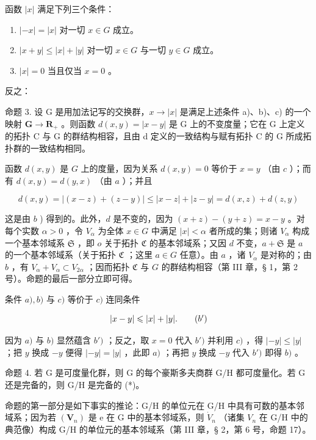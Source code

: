 函数 \(|x|\) 满足下列三个条件：

\begin{enumerate}
\def\labelenumi{\alph{enumi})}
\item
  \(|-x| = |x|\) 对一切 \(x \in G\) 成立。
\item
  \(|x + y| \leqslant |x| + |y|\) 对一切 \(x \in G\) 与一切 \(y \in G\) 成立。
\item
  \(|x| = 0\) 当且仅当 \(x = 0\) 。
\end{enumerate}

反之：

命题 3. 设 G 是用加法记写的交换群，\(x \to |x|\) 是满足上述条件 a)、b)、c) 的一个映射 \(\mathbf{G} \to \mathbf{R}_+\) 。则函数 \(d(x, y) = |x - y|\) 是 G 上的不变度量；它在 G 上定义的拓扑 C 与 G 的群结构相容，且由 d 定义的一致结构与赋有拓扑 C 的 G 所成拓扑群的一致结构相同。

函数 \(d(x, y)\) 是 \(G\) 上的度量，因为关系 \(d(x, y) = 0\) 等价于 \(x = y\) （由 \(c\) ）；而有 \(d(x, y) = d(y, x)\) （由 \(a\) ）；并且

\[
d (x, y) = | (x - z) + (z - y) | \leqslant | x - z | + | z - y | = d (x, z) + d (z, y)
\]

这是由 \(b\) ) 得到的。此外，\(d\) 是不变的，因为 \((x + z) - (y + z) = x - y\) 。对每个实数 \(\alpha > 0\) ，令 \(V_{\alpha}\) 为全体 \(x \in G\) 中满足 \(|x| < \alpha\) 者所成的集；则诸 \(V_{\alpha}\) 构成一个基本邻域系 \(\mathfrak{S}\) ，即 \(o\) 关于拓扑 \(\mathfrak{C}\) 的基本邻域系；又因 \(d\) 不变，\(a + \mathfrak{S}\) 是 \(a\) 的一个基本邻域系（关于拓扑 \(\mathfrak{C}\) ；这里 \(a \in G\) 任意）。由 \(a\) ，诸 \(V_{\alpha}\) 是对称的；由 \(b\) ，有 \(V_{\alpha} + V_{\alpha} \subset V_{2\alpha}\) ；因而拓扑 \(\mathfrak{C}\) 与 \(G\) 的群结构相容（第 III 章，§ 1，第 2 号）。命题的最后一部分立即可得。

条件 \(a), b)\) 与 \(c)\) 等价于 \(c)\) 连同条件

\[
| x - y | \leqslant | x | + | y |.\tag{\(b^{\prime}\)}
\]

因为 \(a)\) 与 \(b)\) 显然蕴含 \(b')\) ；反之，取 \(x = 0\) 代入 \(b')\) 并利用 \(c)\) ，得 \(|-y| \leqslant |y|\) ；把 \(y\) 换成 \(-y\) 便得 \(|-y| = |y|\) ，此即 \(a)\) ；再把 \(y\) 换成 \(-y\) 代入 \(b')\) 即得 \(b)\) 。

命题 4. 若 G 是可度量化群，则 G 的每个豪斯多夫商群 G/H 都可度量化。若 G 还是完备的，则 G/H 是完备的 (*)。

命题的第一部分是如下事实的推论：G/H 的单位元在 G/H 中具有可数的基本邻域系；因为若 \((\mathbf{V}_{n})\) 是 e 在 G 中的基本邻域系，则 \(\dot{V}_{n}\) （诸集 \(V_{n}\) 在 G/H 中的典范像）构成 G/H 的单位元的基本邻域系（第 III 章，§ 2，第 6 号，命题 17）。

